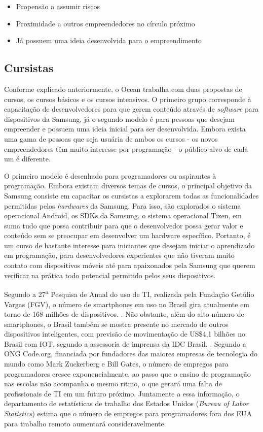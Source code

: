 \begin{itemize}
\item Propensão a assumir riscos
\item Proximidade a outros empreendedores no círculo próximo
\item Já possuem uma ideia desenvolvida para o empreendimento
\end{itemize}


\subsection{Cursistas}
\label{sec:con_cursistas}

Conforme explicado anteriormente, o Ocean trabalha com duas propostas de cursos, os cursos básicos e os cursos intensivos. O primeiro grupo corresponde à capacitação de desenvolvedores para que gerem conteúdo através de \textit{software} para dispositivos da Samsung, já o segundo modelo é para pessoas que desejam empreender e possuem uma ideia inicial para ser desenvolvida. Embora exista uma gama de pessoas que seja usuária de ambos os cursos - os novos empreendedores têm muito interesse por programação - o público-alvo de cada um é diferente.

O primeiro modelo é desenhado para programadores ou aspirantes à programação. Embora existam diversos temas de cursos, o principal objetivo da Samsung consiste em capacitar os cursistas a explorarem todas as funcionalidades permitidas pelos \textit{hardwares} da Samsung. Para isso, são explorados o sistema operacional Android, os SDKs da Samsung, o sistema operacional Tizen, em suma tudo que possa contribuir para que o desenvolvedor possa gerar valor e conteúdo sem se preocupar em desenvolver um hardware específico. Portanto, é um curso de bastante interesse para iniciantes que desejam iniciar o aprendizado em programação, para desenvolvedores experientes que não tiveram muito contato com dispositivos móveis até para apaixonados pela Samsung que querem verificar na prática todo potencial permitido pelos seus dispositivos.

Segundo a 27\textsuperscript{a} Pesquisa de Anual do uso de TI, realizada pela Fundação Getúlio Vargas (FGV), o número de smartphones em uso no Brasil gira atualmente em torno de 168 milhões de dispositivos. \cite{tifgv}. Não obstante, além do alto número de smartphones, o Brasil também se mostra presente no mercado de outros dispositivos inteligentes, com previsão de movimentação de US\$4,1 bilhões no Brasil com IOT, segundo a assessoria de imprensa da IDC Brasil. \cite{idc}. Segundo a ONG Code.org, financiada por fundadores das maiores empresas de tecnologia do mundo como Mark Zuckerberg e Bill Gates, o número de empregos para programadores cresce exponencialmente, ao passo que o ensino de programação nas escolas não acompanha o mesmo ritmo, o que gerará uma falta de profissionais de TI em um futuro próximo. Juntamente a essa informação, o departamento de estatísticas de trabalho dos Estados Unidos (\textit{Bureau of Labor Statistics}) estima que o número de empregos para programadores fora dos EUA para trabalho remoto aumentará consideravelmente. \cite{bls}


